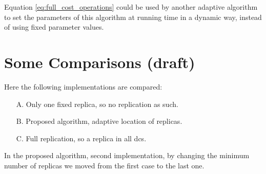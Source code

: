 \documentclass[english]{article}
\begin{document}
Equation \ref{eq:full_cost_operations} could be used by another adaptive algorithm to set the parameters of this algorithm at running time in a dynamic way, instead of using fixed parameter values.


\section{Some Comparisons (draft)}
Here the following implementations are compared:
\begin{itemize}
	\item[A.] Only one fixed replica, so no replication as such.
	
	\item[B.] Proposed algorithm, adaptive location of replicas.

	\item[C.] Full replication, so a replica in all \glspl{dc}.
\end{itemize}

In the proposed algorithm, second implementation, by changing the minimum number of replicas we moved from the first case to the last one.
\end{document}
